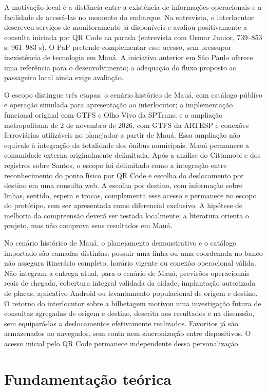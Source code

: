 \documentclass[12pt,oneside,a4paper,brazil,chapter=TITLE]{abntex2}
\let\papsection\section
\renewcommand{\section}{\clearpage\papsection}
\begin{document}
A motivação local é a distância entre a existência de informações operacionais e a facilidade de acessá-las no momento do embarque. Na entrevista, o interlocutor descreveu serviços de monitoramento já disponíveis e avaliou positivamente a consulta iniciada por QR Code na parada  (entrevista com Osmar Junior, 739--853 s; 961--983 s). O PaP pretende complementar esse acesso, sem pressupor inexistência de tecnologia em Mauá. A iniciativa anterior em São Paulo oferece uma referência para o desenvolvimento; a adequação do fluxo proposto ao passageiro local ainda exige avaliação.

O escopo distingue três etapas: o cenário histórico de Mauá, com catálogo público e operação simulada para apresentação ao interlocutor; a implementação funcional original com GTFS e Olho Vivo da SPTrans; e a ampliação metropolitana de 2 de novembro de 2026, com GTFS da ARTESP e conexões ferroviárias utilizáveis no planejador a partir de Mauá. Essa ampliação não equivale à integração da totalidade dos ônibus municipais. Mauá permanece a comunidade externa originalmente delimitada. Após a análise do Cittamobi e dos registros sobre Santos, o escopo foi delimitado como a integração entre reconhecimento do ponto físico por QR Code e escolha do deslocamento por destino em uma consulta web. A escolha por destino, com informação sobre linhas, sentido, espera e trocas, complementa esse acesso e permanece no escopo do protótipo, sem ser apresentada como diferencial exclusivo. A hipótese de melhoria da compreensão deverá ser testada localmente; a literatura orienta o projeto, mas não comprova seus resultados em Mauá.

No cenário histórico de Mauá, o planejamento demonstrativo e o catálogo importado são camadas distintas: possuir uma linha ou uma coordenada no banco não assegura itinerário completo, horário vigente ou conexão operacional válida. Não integram a entrega atual, para o cenário de Mauá, previsões operacionais reais de chegada, cobertura integral validada da cidade, implantação autorizada de placas, aplicativo Android ou levantamento populacional de origem e destino. O retorno do interlocutor sobre a bilhetagem motivou uma investigação futura de consultas agregadas de origem e destino, descrita nos resultados e na discussão, sem equipará-las a deslocamentos efetivamente realizados. Favoritos já são armazenados no navegador, sem conta nem sincronização entre dispositivos. O acesso inicial pelo QR Code permanece independente dessa personalização.

\section{Fundamentação teórica}
\end{document}
